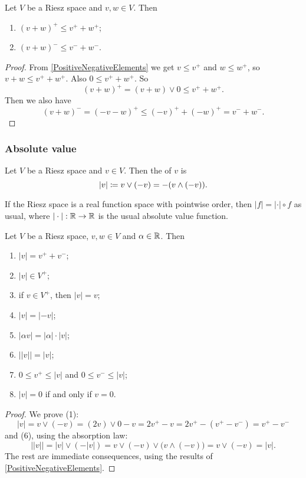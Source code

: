 \begin{proposition} \label{triangleInequalityPositiveNegativeElements}
Let $V$ be a Riesz space and $v,w\in V$. Then
\begin{enumerate}
\item $(v+w)^+ \leq v^+ + w^+$;
\item $(v+w)^- \leq v^- + w^-$.
\end{enumerate}
\end{proposition}
\begin{proof}
From \ref{PositiveNegativeElements} we get $v \leq v^+$ and $w\leq w^+$, so $v+w \leq v^+ + w^+$. Also $0 \leq v^+ + w^+$. So
\[ (v+w)^+ = (v+w)\vee 0 \leq v^+ + w^+. \]
Then we also have
\[ (v+w)^- = (-v-w)^+ \leq (-v)^+ + (-w)^+ = v^- + w^-. \]
\end{proof}

\subsubsection{Absolute value}
\begin{definition}
Let $V$ be a Riesz space and $v\in V$. Then the  of $v$ is
\[ |v| \coloneqq v\vee (-v) = -(v\wedge (-v)). \]
\end{definition}

If the Riesz space is a real function space with pointwise order, then $|f| = |\cdot|\circ f$ as usual, where $|\cdot|: \mathbb{R}\to \mathbb{R}$ is the usual absolute value function.

\begin{lemma} \label{absoluteValue}
Let $V$ be a Riesz space, $v,w\in V$ and $\alpha\in \mathbb{R}$. Then
\begin{enumerate}
\item $|v| = v^+ + v^-$;
\item $|v| \in V^+$;
\item if $v\in V^+$, then $|v| = v$;
\item $|v| = |-v|$;
\item $|\alpha v| = |\alpha|\cdot |v|$;
\item $\big||v|\big| = |v|$;
\item $0 \leq v^+ \leq |v|$ and $0 \leq v^- \leq |v|$;
\item $|v| = 0$ \textup{if and only if} $v = 0$.
\end{enumerate}
\end{lemma}
\begin{proof}
We prove (1):
\[ |v| = v\vee (-v) = (2v)\vee 0 - v = 2v^+ - v = 2v^+ - (v^+ - v^-) = v^+ - v^- \]
and (6), using the absorption law:
\[ \big||v|\big| = |v|\vee (-|v|) = v \vee (-v) \vee \big( v\wedge (-v) \big) = v \vee (-v) = |v|. \]
The rest are immediate consequences, using the results of \ref{PositiveNegativeElements}.
\end{proof}

